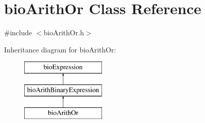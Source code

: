 \hypertarget{classbio_arith_or}{}\section{bio\+Arith\+Or Class Reference}
\label{classbio_arith_or}


{\ttfamily \#include $<$bio\+Arith\+Or.\+h$>$}

Inheritance diagram for bio\+Arith\+Or\+:\begin{figure}[H]
\begin{center}
\leavevmode
\includegraphics[height=3.000000cm]{classbio_arith_or}
\end{center}
\end{figure}
